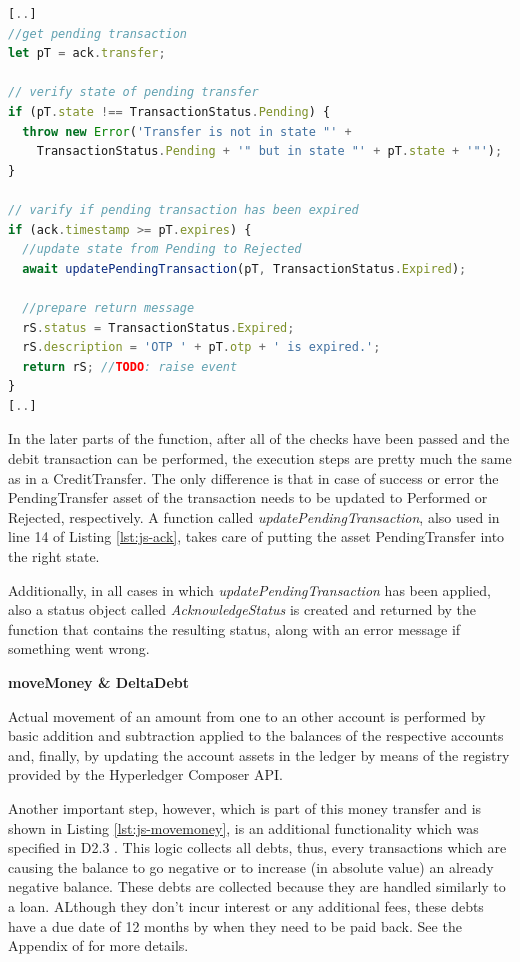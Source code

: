 \begin{center}
\begin{minipage}{0.8\textwidth}
\small
\begin{lstlisting}[language=javascript,firstnumber=1,caption={\bf\small RequestDebitAcknowledge JavaScript excerpt}, captionpos=b,label=lst:js-ack]
[..]
//get pending transaction
let pT = ack.transfer;

// verify state of pending transfer
if (pT.state !== TransactionStatus.Pending) {
  throw new Error('Transfer is not in state "' +
    TransactionStatus.Pending + '" but in state "' + pT.state + '"');
}

// varify if pending transaction has been expired
if (ack.timestamp >= pT.expires) {
  //update state from Pending to Rejected
  await updatePendingTransaction(pT, TransactionStatus.Expired);

  //prepare return message
  rS.status = TransactionStatus.Expired;
  rS.description = 'OTP ' + pT.otp + ' is expired.';
  return rS; //TODO: raise event
}
[..]
\end{lstlisting}
\end{minipage}
\end{center}

In the later parts of the function, after all of the checks have been passed and the debit transaction can be performed, the execution steps are pretty much the same as in a CreditTransfer. The only difference is that in case of success or error the PendingTransfer asset of the transaction needs to be updated to Performed or Rejected, respectively. A function called \textit{updatePendingTransaction}, also used in line 14 of Listing \ref{lst:js-ack}, takes care of putting the asset PendingTransfer into the right state.

Additionally, in all cases in which \textit{updatePendingTransaction} has been applied, also a status object called \textit{AcknowledgeStatus} is created and returned by the function that contains the resulting status, along with an error message if something went wrong.

\textbf{moveMoney \& DeltaDebt}

Actual movement of an amount from one to an other account is performed by basic addition and subtraction applied to the balances of the respective accounts and, finally, by updating the account assets in the ledger by means of the registry provided by the Hyperledger Composer API.

Another important step, however, which is part of this money transfer and is shown in Listing \ref{lst:js-movemoney}, is an additional functionality which was specified in D2.3 \cite{INTERLACE_D23}. This logic collects all debts, thus, every transactions which are causing the balance to go negative or to increase (in absolute value) an already negative balance. These debts are collected because they are handled similarly to a loan. ALthough they don't incur interest or any additional fees, these debts have a due date of 12 months by when they need to be paid back. See the Appendix of \cite{INTERLACE_D23} for more details.

